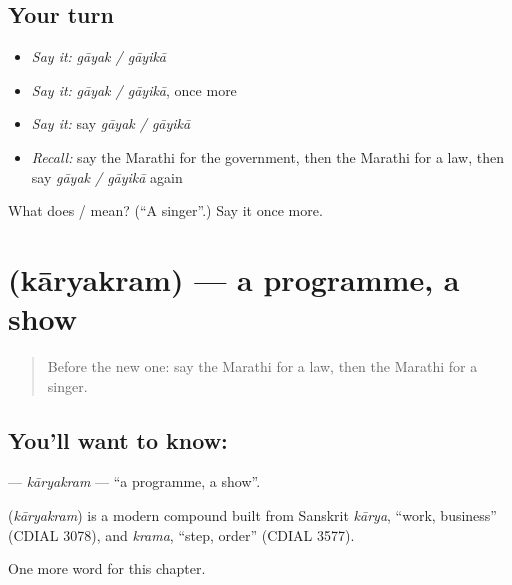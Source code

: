 \subsection*{Your turn}
\begin{itemize}
\raggedright
  \item \emph{Say it:} \emph{gāyak / gāyikā}
  \item \emph{Say it:} \emph{gāyak / gāyikā}, once more
  \item \emph{Say it:} say \emph{gāyak / gāyikā}
  \item \emph{Recall:} say the Marathi for the government, then the Marathi for a law, then say \emph{gāyak / gāyikā} again
\end{itemize}

\begin{tcolorbox}[breakable,colback=teal!4,colframe=teal!35!black,title={Before you move on}]
What does  /  mean? (\textquotedblleft{}A singer\textquotedblright{}.) Say it once more.
\end{tcolorbox}
\section[\texorpdfstring{\mr{कार्यक्रम} (kāryakram)}{कार्यक्रम (kāryakram)}]{ (kāryakram) — a programme, a show}

\label{lesson:MR-C263-karyakram}



\begin{quote}
Before the new one: say the Marathi for a law, then the Marathi for a singer.
\end{quote}

\subsection*{You'll want to know: }
\textbf{} — \emph{kāryakram} — \textquotedblleft{}a programme, a show\textquotedblright{}.

\begin{cousinweb}
\textbf{} (\emph{kāryakram}) is a modern compound built from Sanskrit \emph{kārya}, \textquotedblleft{}work, business\textquotedblright{} (CDIAL 3078), and \emph{krama}, \textquotedblleft{}step, order\textquotedblright{} (CDIAL 3577).
\end{cousinweb}

\begin{grammarlens}[title={What you've built}]
One more word for this chapter.
\end{grammarlens}

